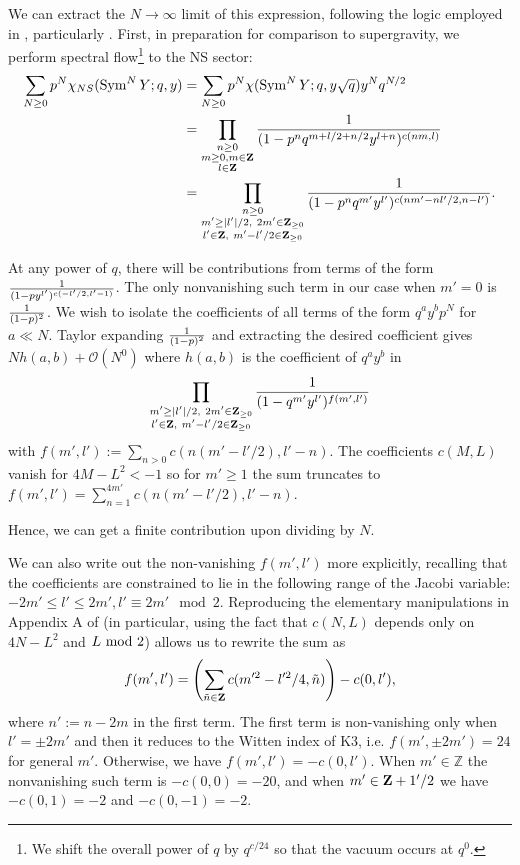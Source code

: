 \documentclass[../main.tex]{subfiles}
\begin{document}
We can extract the $N \rightarrow \infty$ limit of this expression, following the logic employed in \cite{deBoerEG, MAGOO, BKKP}, particularly \cite{BKKP}. First, in preparation for comparison to supergravity, we perform spectral flow\footnote{We shift the overall power of $q$ by $q^{c/24}$ so that the vacuum occurs at $q^0$.} to the NS sector:
\begin{align*}
\sum_{N \geq 0}p^N \chi_{NS}(\operatorname{Sym}^N Y; q, y) & = \sum_{N\geq 0}p^N \chi(\operatorname{Sym}^N Y; q, y \sqrt{q}) y^N q^{N/2} \\
&= \prod_{\substack{n \geq 0 \\ m \geq 0, m \in \mathbf Z \\ l \in \mathbf Z}} \frac{1}{(1 - p^n q^{m + l/2 + n/2} y^{l + n})^{c(nm,l)}} \\
&= \prod_{\substack{n \geq0 \\ m' \geq |l'|/2, \ 2 m' \in \mathbf Z_{\geq 0} \\ l' \in \mathbf Z, \ m' - l'/2 \in \mathbf Z_{\geq 0}}} \frac{1}{(1 - p^n q^{m'} y^{l'})^{c(nm' - nl'/2,n-l')}}.
\end{align*}

At any power of $q$, there will be contributions from terms of the form ${1 \over (1 - p y^{l'})^{c(-l'/2, l'-1)}}$. The only nonvanishing such term in our case when $m'=0$ is ${1 \over (1 - p)^2}$. We wish to isolate the coefficients of all terms of the form $q^a y^b p^N$ for $a \ll N$. Taylor expanding ${1 \over (1-p)^2}$ and extracting the desired coefficient gives $N h(a, b) + \mathcal{O}(N^0)$ where $h(a, b)$ is the coefficient of $q^a y^b$ in
\begin{equation}\nonumber
\prod_{\substack{m' \geq |l'|/2, \ 2 m' \in \mathbf Z_{\geq 0} \\ l' \in \mathbf Z, \  m' - l'/2 \in \mathbf Z_{\geq 0}}}{1 \over (1 - q^{m'} y^{l'})^{f(m', l')}}
\end{equation}with $f(m', l'):= \sum_{n >0}c(n(m' -  l'/2), l' - n)$.  The coefficients $c(M, L)$ vanish for $4M-L^2 < -1$ so for $m' \geq 1$ the sum truncates to $f(m', l') = \sum_{n=1}^{4m'}c(n(m' -  l'/2), l' - n)$.

Hence, we can get a finite contribution upon dividing by $N$. 

We can also write out the non-vanishing $f(m', l')$ more explicitly, recalling that the coefficients are constrained to lie in the following range of the Jacobi variable: $-2m' \leq l' \leq 2m', l' \equiv 2 m' \mod 2$. Reproducing the elementary manipulations in Appendix A of \cite{BKKP} (in particular, using the fact that $c(N, L)$ depends only on $4N-L^2$ and $L \ {\rm mod} \ 2$) allows us to rewrite the sum as
\begin{equation}\label{eq:fml1}
f(m', l') = \left( \sum_{\tilde{n} \in \mathbf Z}c(m'^2 - l'^2/4, \tilde{n}) \right) - c(0, l'),
\end{equation} where $n':= n - 2m$ in the first term. 
The first term is non-vanishing only when $l' = \pm 2 m'$ and then it reduces to the Witten index of K3, i.e. $f(m', \pm 2m') = 24$ for general $m'$. Otherwise, we have $f(m', l') = -c(0, l')$. When $m' \in \mathbb{Z}$ the nonvanishing such term is $-c(0, 0) = -20$, and when $m' \in \mathbf Z + 1'/2$ we have $-c(0, 1) = -2$ and $-c(0, -1) = -2$. 
\end{document}
